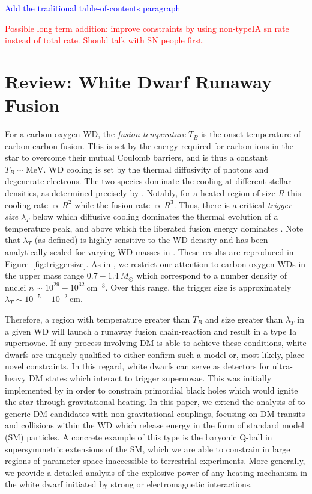 \documentclass[twocolumn,showpacs,preprintnumbers,amsmath,amssymb,prd]{revtex4}
\newcommand{\MeV}{\text{MeV}}
\newcommand{\cm}{\text{cm}}
\begin{document}
\textcolor{blue}{Add the traditional table-of-contents paragraph}

\textcolor{red}{Possible long term addition: improve constraints by using non-typeIA sn rate instead of total rate. Should talk with SN people first.}

\section{Review: White Dwarf Runaway Fusion}

For a carbon-oxygen WD, the \emph{fusion temperature} $T_B$ is the onset temperature of carbon-carbon fusion. This is set by the energy required for carbon ions in the star to overcome their mutual Coulomb barriers, and is thus a constant $T_B \sim \MeV$. WD cooling is set by the thermal diffusivity of photons and degenerate electrons. The two species dominate the cooling at different stellar densities, as determined precisely by \cite{Woosley}. Notably, for a heated region of size $R$ this cooling rate $\propto R^2$ while the fusion rate $\propto R^3$. Thus, there is a critical \emph{trigger size} $\lambda_T$ below which diffusive cooling dominates the thermal evolution of a temperature peak, and above which the liberated fusion energy dominates \cite{Woosley}. Note that $\lambda_T$ (as defined) is highly sensitive to the WD density and has been analytically scaled for varying WD masses in \cite{Graham:2015apa}. These results are reproduced in Figure~\ref{fig:triggersize}. As in \cite{Graham:2015apa}, we restrict our attention to carbon-oxygen WDs in the upper mass range $0.7 - 1.4 ~M_{\odot}$ which correspond to a number density of nuclei $n \sim 10^{29} - 10^{32} ~\cm^{-3}$. Over this range, the trigger size is approximately $\lambda_T \sim 10^{-5} - 10^{-2} ~\text{cm}$.

Therefore, a region with temperature greater than $T_B$ and size greater than $\lambda_T$ in a given WD will launch a runaway fusion chain-reaction and result in a type Ia supernovae. If any process involving DM is able to achieve these conditions, white dwarfs are uniquely qualified to either confirm such a model or, most likely, place novel constraints. In this regard, white dwarfs can serve as detectors for ultra-heavy DM states which interact to trigger supernovae. This was initially implemented by \cite{Graham:2015apa} in order to constrain primordial black holes which would ignite the star through gravitational heating. In this paper, we extend the analysis of \cite{Graham:2015apa} to generic DM candidates with non-gravitational couplings, focusing on DM transits and collisions within the WD which release energy in the form of standard model (SM) particles. A concrete example of this type is the baryonic Q-ball in supersymmetric extensions of the SM, which we are able to constrain in large regions of parameter space inaccessible to terrestrial experiments. More generally, we provide a detailed analysis of the explosive power of any heating mechanism in the white dwarf initiated by strong or electromagnetic interactions.
\end{document}
